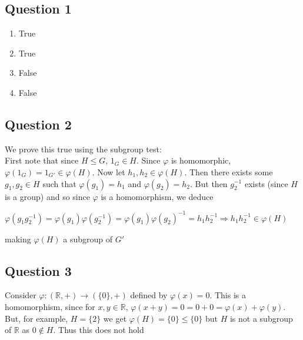 \documentclass[letterpaper, 11pt]{article}
\newcommand{\R}{\mathbb{R}}   %
\newcommand{\1}{\mathds{1}}	%
\theoremstyle{definition}
\begin{document}
\subsection*{Question 1}
\begin{enumerate}[label=(\alph*)]
\item True
\item True
\item False
\item False
\end{enumerate}

\subsection*{Question 2}
We prove this true using the subgroup test: \\
First note that since $H \le G$, $1_G \in H$. Since $\varphi$ is homomorphic, $\varphi (1_G) = 1_{G'} \in \varphi (H)$. Now let $h_1, h_2 \in \varphi (H)$. Then there exists some $g_1, g_2 \in H$ such that $\varphi (g_1) = h_1$ and $\varphi (g_2) = h_2$. But then $g_2^{-1}$ exists (since $H$ is a group) and so since $\varphi$ is a homomorphism, we deduce
\begin{center}
 $\varphi(g_1 g_2^{-1}) = \varphi(g_1)\varphi(g_2^{-1}) = \varphi(g_1)\varphi(g_2)^{-1} = h_1 h_2^{-1} \Rightarrow h_1 h_2^{-1} \in \varphi (H)$ 
 
 \end{center}
 making $\varphi (H)$ a subgroup of $G'$

\subsection*{Question 3}
Consider $\varphi : (\R, +) \to (\{ 0\}, +)$ defined by $\varphi (x) = 0$. This is a homomorphism, since for $x,y\in \R$, $\varphi(x+y)=0=0+0=\varphi(x)+\varphi(y)$. But, for example,  $H = \{2\}$ we get $\varphi (H) = \{0\} \le \{0\}$ but $H$ is not a subgroup of $\R$ as $0 \notin H$. Thus this does not hold
\end{document}
